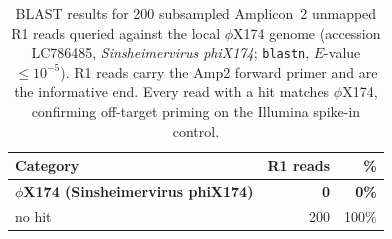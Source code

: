 \begin{table}[H]
  \centering
  \caption{BLAST results for 200 subsampled Amplicon~2 unmapped R1 reads
    queried against the local $\phi$X174 genome (accession LC786485,
    \textit{Sinsheimervirus phiX174}; \texttt{blastn}, \(E\)-value
    \(\leq 10^{-5}\)).  R1 reads carry the Amp2 forward primer and are
    the informative end.  Every read with a hit matches $\phi$X174,
    confirming off-target priming on the Illumina spike-in control.}
  \label{tab:blast-amp2}
  \begin{tabular}{lrr}
    \toprule
    \textbf{Category} & \textbf{R1 reads} & \textbf{\%} \\
    \midrule
  \textbf{$\phi$X174 (Sinsheimervirus phiX174)} & \textbf{0} & \textbf{0\%} \\
  no hit & 200 & 100\% \\
    \bottomrule
  \end{tabular}
\end{table}
